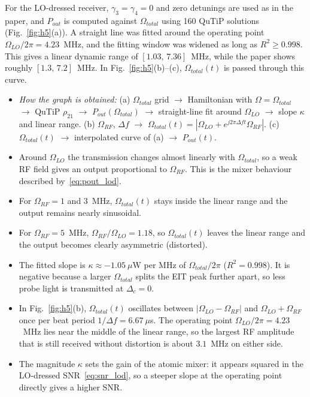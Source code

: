 \documentclass[11pt,a4paper]{article}
\begin{document}
For the LO-dressed receiver, $\gamma_3=\gamma_4=0$ and zero detunings are used as in the paper,
and $P_{out}$ is computed against $\Omega_{total}$ using 160 QuTiP solutions
(Fig.~\ref{fig:h5}(a)). A straight line was fitted around the operating point
$\Omega_{LO}/2\pi=4.23$~MHz, and the fitting window was widened as long as $R^2\geq0.998$. This
gives a linear dynamic range of $[1.03,\,7.36]$~MHz, while the paper shows roughly
$[1.3,\,7.2]$~MHz. In Fig.~\ref{fig:h5}(b)--(c), $\Omega_{total}(t)$ is passed through this
curve.
\begin{itemize}[leftmargin=*,itemsep=2pt]
  \item \textit{How the graph is obtained:} (a) $\Omega_{total}$ grid $\rightarrow$
        Hamiltonian with $\Omega=\Omega_{total}$ $\rightarrow$ QuTiP $\rho_{21}$ $\rightarrow$
        $P_{out}(\Omega_{total})$ $\rightarrow$ straight-line fit around $\Omega_{LO}$
        $\rightarrow$ slope $\kappa$ and linear range. (b) $\Omega_{RF}$, $\Delta f$
        $\rightarrow$ $\Omega_{total}(t)=|\Omega_{LO}+e^{j2\pi\Delta f t}\Omega_{RF}|$.
        (c) $\Omega_{total}(t)$ $\rightarrow$ interpolated curve of (a) $\rightarrow$
        $P_{out}(t)$.
  \item Around $\Omega_{LO}$ the transmission changes almost linearly with $\Omega_{total}$, so
        a weak RF field gives an output proportional to $\Omega_{RF}$. This is the mixer
        behaviour described by~\eqref{eq:pout_lod}.
  \item For $\Omega_{RF}=1$ and $3$~MHz, $\Omega_{total}(t)$ stays inside the linear range and
        the output remains nearly sinusoidal.
  \item For $\Omega_{RF}=5$~MHz, $\Omega_{RF}/\Omega_{LO}=1.18$, so $\Omega_{total}(t)$ leaves
        the linear range and the output becomes clearly asymmetric (distorted).
  \item The fitted slope is $\kappa\approx-1.05~\mu$W per MHz of $\Omega_{total}/2\pi$
        ($R^2=0.998$). It is negative because a larger $\Omega_{total}$ splits the EIT peak further
        apart, so less probe light is transmitted at $\Delta_c=0$.
  \item In Fig.~\ref{fig:h5}(b), $\Omega_{total}(t)$ oscillates between
        $|\Omega_{LO}-\Omega_{RF}|$ and $\Omega_{LO}+\Omega_{RF}$ once per beat period
        $1/\Delta f=6.67~\mu$s. The operating point $\Omega_{LO}/2\pi=4.23$~MHz lies near the
        middle of the linear range, so the largest RF amplitude that is still received without
        distortion is about $3.1$~MHz on either side.
  \item The magnitude $\kappa$ sets the gain of the atomic mixer: it appears squared in the
        LO-dressed SNR~\eqref{eq:snr_lod}, so a steeper slope at the operating point directly
        gives a higher SNR.
\end{itemize}
\end{document}

